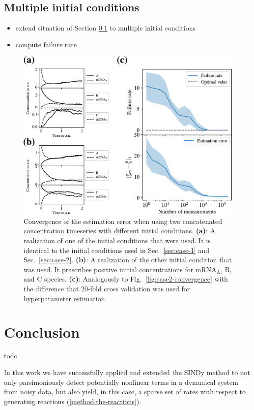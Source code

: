 \documentclass[oneside, abstracton, titlepage]{scrartcl}
\newenvironment{colbox}[1]
{\newcommand\colboxcolor{#1}%
	\begin{lrbox}{\selvestebox}%
		\begin{minipage}{\dimexpr\columnwidth-2\fboxsep\relax}}
		{\end{minipage}\end{lrbox}%
	\begin{center}
		\colorbox[HTML]{\colboxcolor}{\usebox{\selvestebox}}
\end{center}}
\begin{document}
	\subsection{Multiple initial conditions}\label{sec:case-3}
	
	\begin{itemize}
		\item extend situation of Section \ref{sec:case-3} to multiple initial conditions
		\item compute failure rate
	\end{itemize}

	\begin{figure}
		\centering
		\includegraphics[width=\columnwidth]{./figures_tex/case3}
		\caption{Convergence of the estimation error when using two concatenated concentration timeseries with different initial conditions. \textbf{(a)}: A realization of one of the initial conditions that were used. It is identical to the initial conditions used in Sec.~\ref{sec:case-1} and Sec.~\ref{sec:case-2}. \textbf{(b)}: A realization of the other initial condition that was used. It prescribes positive initial concentrations for $\mathrm{mRNA}_\mathrm{A}$, $\mathrm{B}$, and $\mathrm{C}$ species. \textbf{(c)}: Analogously to Fig.~\ref{fig:case2-convergence} with the difference that 20-fold cross validation was used for hyperparameter estimation.}
	\end{figure}
    
	\section{Conclusion}
	\begin{colbox}{F8E0E0}
		todo
	\end{colbox}
	In this work we have successfully applied and extended the SINDy method to not only parsimoniously detect potentially nonlinear terms in a dynamical system from noisy data, but also yield, in this case, a sparse set of rates with respect to generating reactions (\ref{method:the-reactions}).
\end{document}
